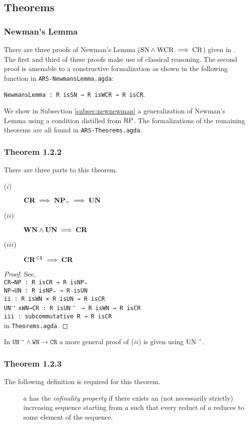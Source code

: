 \subsection{Theorems}\label{subsec:theorems}
\subsubsection{Newman's Lemma}
There are three proofs of Newman's Lemma ($\mathrm{SN} \land \mathrm{WCR} \implies \mathrm{CR}$) given in \terese. 
The first and third of these proofs make use of classical reasoning. The second proof is amenable to a 
constructive formalization as shown in the following function in \texttt{ARS-NewmansLemma.agda}:

\verb|NewmansLemma : R isSN → R isWCR → R isCR|.

We show in Subsection \ref{subsec:newnewman} a generalization of Newman's Lemma using a condition distilled from $\mathrm{RP}$. 
The formalizations of the remaining theorems are all found in \texttt{ARS-Theorems.agda}. 
\subsubsection{Theorem 1.2.2}
There are three parts to this theorem. 
\begin{description}
    \item[($i$)] $\mathbf{CR} \implies \mathbf{NP_=} \implies \mathbf{UN}$
    \item[($ii$)] $\mathbf{WN} \land \mathbf{UN} \implies \mathbf{CR}$  
    \item[($iii$)] $\mathbf{CR^{\le 1}} \implies \mathbf{CR}$
\end{description}

\begin{proof}
    See, \\
    \verb|CR→NP : R isCR → R isNP₌|\\
    \verb|NP→UN : R isNP₌ → R isUN|\\
    \verb|ii : R isWN × R isUN → R isCR|\\
    \verb||\texttt{UN}$^{\to}$ \verb|∧WN→CR : R |\texttt{isUN}$^{\to}$ \verb| → R isWN → R isCR|\\
    \verb|iii : subcommutative R → R isCR|\\
    in \texttt{Theorems.agda}.
\end{proof}
\begin{remark}
    In $\mathtt{UN^{→}∧WN→CR}$ a more general proof of ($ii$) is given using $\mathrm{UN}^{\to}$.
\end{remark}

\subsubsection{Theorem 1.2.3}
The following definition is required for this theorem.
\begin{definition}\hfill
    \begin{description}
        \item[] $a$ has the \emph{cofinality property} if there exists an 
        (not necessarily strictly) increasing sequence starting from $a$ such that every
        reduct of $a$ reduces to some element of the sequence.
    \end{description}
\end{definition}

